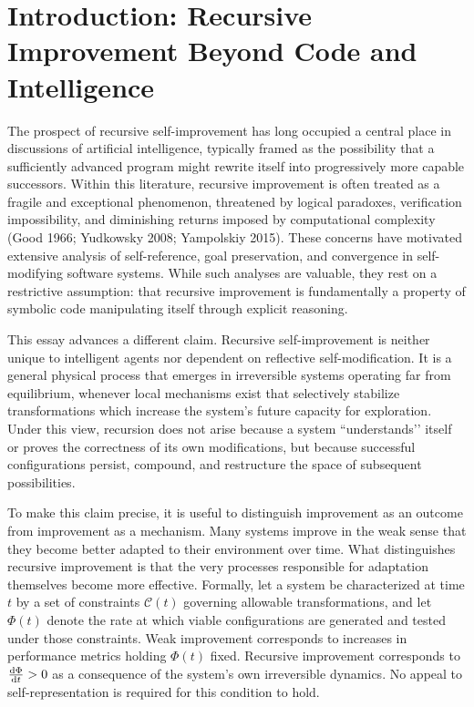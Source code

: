 \documentclass[11pt]{article}
\begin{document}
\newpage
\section{Introduction: Recursive Improvement Beyond Code and Intelligence}

The prospect of recursive self-improvement has long occupied a central place in discussions of artificial intelligence, typically framed as the possibility that a sufficiently advanced program might rewrite itself into progressively more capable successors. Within this literature, recursive improvement is often treated as a fragile and exceptional phenomenon, threatened by logical paradoxes, verification impossibility, and diminishing returns imposed by computational complexity (Good 1966; Yudkowsky 2008; Yampolskiy 2015). These concerns have motivated extensive analysis of self-reference, goal preservation, and convergence in self-modifying software systems. While such analyses are valuable, they rest on a restrictive assumption: that recursive improvement is fundamentally a property of symbolic code manipulating itself through explicit reasoning.

This essay advances a different claim. Recursive self-improvement is neither unique to intelligent agents nor dependent on reflective self-modification. It is a general physical process that emerges in irreversible systems operating far from equilibrium, whenever local mechanisms exist that selectively stabilize transformations which increase the system’s future capacity for exploration. Under this view, recursion does not arise because a system ``understands’’ itself or proves the correctness of its own modifications, but because successful configurations persist, compound, and restructure the space of subsequent possibilities.

To make this claim precise, it is useful to distinguish improvement as an outcome from improvement as a mechanism. Many systems improve in the weak sense that they become better adapted to their environment over time. What distinguishes recursive improvement is that the very processes responsible for adaptation themselves become more effective. Formally, let a system be characterized at time $t$ by a set of constraints $\mathcal{C}(t)$ governing allowable transformations, and let $\Phi(t)$ denote the rate at which viable configurations are generated and tested under those constraints. Weak improvement corresponds to increases in performance metrics holding $\Phi(t)$ fixed. Recursive improvement corresponds to $\dv{\Phi}{t} > 0$ as a consequence of the system’s own irreversible dynamics. No appeal to self-representation is required for this condition to hold.
\end{document}
